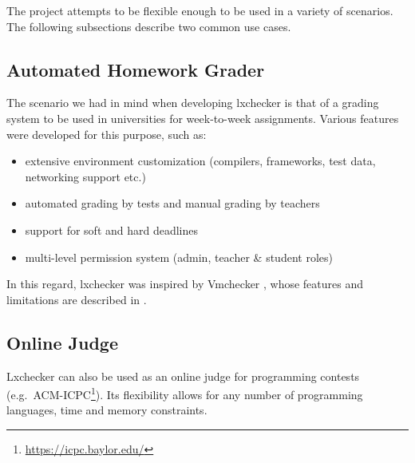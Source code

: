 The project attempts to be flexible enough to be used in a variety of scenarios. The following subsections describe two common use cases.

\subsection{Automated Homework Grader}
\label{sub-sec:homework}

The scenario we had in mind when developing lxchecker is that of a grading system to be used in universities for week-to-week assignments. Various features were developed for this purpose, such as:
\begin{itemize}
	\item extensive environment customization (compilers, frameworks, test data, networking support etc.)
	\item automated grading by tests and manual grading by teachers
	\item support for soft and hard deadlines
	\item multi-level permission system (admin, teacher \& student roles)
\end{itemize}

In this regard, lxchecker was inspired by Vmchecker \cite{gosu}, whose features and limitations are described in .

\subsection{Online Judge}
\label{sub-sec:judge}

Lxchecker can also be used as an online judge for programming contests (e.g.\ ACM-ICPC\footnote{\url{https://icpc.baylor.edu/}}). Its flexibility allows for any number of programming languages, time and memory constraints.
